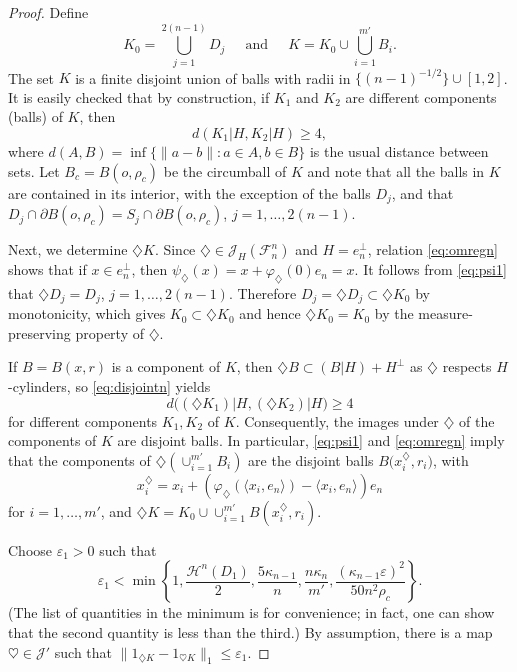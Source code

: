 \documentclass[12pt,reqno]{amsart}
\newcommand{\ee}{\varepsilon}
\newcommand{\cH}{{\mathcal H}}
\newcommand{\cF}{\mathcal F}
\newcommand{\cJ}{\mathcal J}
\newcommand{\di}{\diamondsuit}
\numberwithin{equation}{section}
\begin{document}
\begin{proof}
Define
\[
K_0= {\textstyle \bigcup}_{j=1}^{2(n-1)} D_j ~~\quad{\text{and}}~~\quad
K=K_0\cup {\textstyle \bigcup}_{i=1}^{m'} B_i.
\]
The set $K$ is a finite disjoint union of balls with radii in $\{(n-1)^{-1/2}\}\cup[1,2]$. It is easily checked that by construction, if $K_1$ and $K_2$ are different components (balls) of $K$, then
\begin{equation}\label{eq:disjointn}
d(K_1|H,K_2|H)\ge 4,
\end{equation}
where $d(A,B)=\inf\{\|a-b\|: a\in A, b\in B\}$ is the usual distance between sets. Let $B_c=B(o,\rho_c)$ be the circumball of $K$ and note that all the balls in $K$ are contained in its interior, with the exception of the balls $D_j$, and that $D_j\cap\partial B(o,\rho_c)=S_j\cap \partial B(o,\rho_c)$, $j=1,\dots,2(n-1)$.

Next, we determine $\di K$. Since $\di\in \cJ_H(\cF_n^n)$ and $H=e_n^{\perp}$, relation
\eqref{eq:omregn} shows that if $x\in e_n^{\perp}$, then $\psi_{\di}(x)=x+\varphi_{\di}(0)e_n=x$. It follows from \eqref{eq:psi1} that $\di D_j=D_j$, $j=1,\dots, 2(n-1)$. Therefore $D_j=\di D_j\subset \di K_0$ by monotonicity, which gives $K_0\subset \di K_0$ and hence $\di K_0=K_0$ by the measure-preserving property of $\di$.

If $B=B(x,r)$ is a component of $K$, then $\di B\subset (B|H)+H^\perp$ as $\di$ respects $H$-cylinders, so \eqref{eq:disjointn} yields
\begin{equation}\label{eq:disjointn_din}
d\big((\di K_1)|H,(\di K_2)|H\big)\ge 4
\end{equation}
for different components $K_1, K_2$ of $K$. Consequently, the images under $\di$ of the components of $K$ are disjoint balls. In particular, \eqref{eq:psi1} and \eqref{eq:omregn} imply that the components of $\di \left(\cup_{i=1}^{m'} B_i\right)$ are the disjoint balls
$B\big(x_i^\di,r_i\big)$, with
\[
x_i^\di=x_i+\left(\varphi_\di(\langle x_i,e_n\rangle)-\langle x_i,e_n\rangle\right)e_n
\]
for $i=1,\dots,m'$, and $\di K=K_0\cup\cup_{i=1}^{m'} B(x_i^\di,r_i).$

Choose $\ee_1>0$ such that
\begin{equation}\label{eqepchoose}
\ee_1<\min\left\{1,\frac{{\cH}^n(D_1)}{2}, \frac{5\kappa_{n-1}}{n}, \frac{n\kappa_n}{m'}, \frac{(\kappa_{n-1}\ee)^2}{50n^2\rho_c}\right\}.
\end{equation}
(The list of quantities in the minimum is for convenience; in fact, one can show that the second quantity is less than the third.) By assumption, there is a map $\heartsuit\in \cJ'$ such that
$\|1_{\di K}-1_{\heartsuit K}\|_1\le \ee_1$.


\end{proof}
\end{document}
